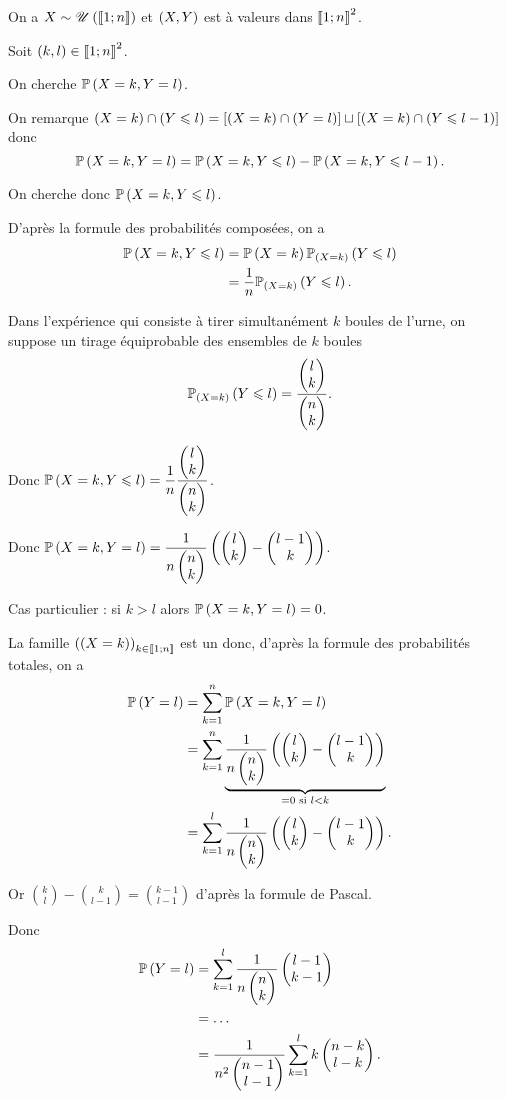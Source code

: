\begin{corr}
On a \(X\sim\loiuniforme{\interventierii{1}{n}}\) et \(\paren{X,Y}\) est à valeurs dans \(\interventierii{1}{n}^2\).

Soit \(\paren{k,l}\in\interventierii{1}{n}^2\).

On cherche \(\proba{X=k,Y=l}\).

On remarque \(\paren{X=k}\inter\paren{Y\leq l}=\croch{\paren{X=k}\inter\paren{Y=l}}\sqcup\croch{\paren{X=k}\inter\paren{Y\leq l-1}}\) donc \[\proba{X=k,Y=l}=\proba{X=k,Y\leq l}-\proba{X=k,Y\leq l-1}.\]

On cherche donc \(\proba{X=k,Y\leq l}\).

D'après la formule des probabilités composées, on a \[\begin{aligned}
\proba{X=k,Y\leq l}&=\proba{X=k}\probacond{Y\leq l}{\paren{X=k}} \\
&=\dfrac{1}{n}\probacond{Y\leq l}{\paren{X=k}}.
\end{aligned}\]

Dans l'expérience qui consiste à tirer simultanément \(k\) boules de l'urne, on suppose un tirage équiprobable des ensembles de \(k\) boules \ie \[\probacond{Y\leq l}{\paren{X=k}}=\dfrac{\binom{k}{l}}{\binom{k}{n}}.\]

Donc \(\proba{X=k,Y\leq l}=\dfrac{1}{n}\dfrac{\binom{k}{l}}{\binom{k}{n}}\).

Donc \(\proba{X=k,Y=l}=\dfrac{1}{n\binom{k}{n}}\paren{\binom{k}{l}-\binom{k}{l-1}}\).

Cas particulier : si \(k>l\) alors \(\proba{X=k,Y=l}=0\).

La famille \(\paren{\paren{X=k}}_{k\in\interventierii{1}{n}}\) est un \sce donc, d'après la formule des probabilités totales, on a \[\begin{aligned}
\proba{Y=l}&=\sum_{k=1}^{n}\proba{X=k,Y=l} \\
&=\sum_{k=1}^{n}\underbrace{\dfrac{1}{n\binom{k}{n}}\paren{\binom{k}{l}-\binom{k}{l-1}}}_{=0\text{ si }l<k} \\
&=\sum_{k=1}^{l}\dfrac{1}{n\binom{k}{n}}\paren{\binom{k}{l}-\binom{k}{l-1}}.
\end{aligned}\]

Or \(\binom{k}{l}-\binom{k}{l-1}=\binom{k-1}{l-1}\) d'après la formule de Pascal.

Donc \[\begin{aligned}
\proba{Y=l}&=\sum_{k=1}^{l}\dfrac{1}{n\binom{k}{n}}\binom{k-1}{l-1} \\
&=\dots \\
&=\dfrac{1}{n^2\binom{l-1}{n-1}}\sum_{k=1}^l k\binom{l-k}{n-k}.
\end{aligned}\]
\end{corr}

